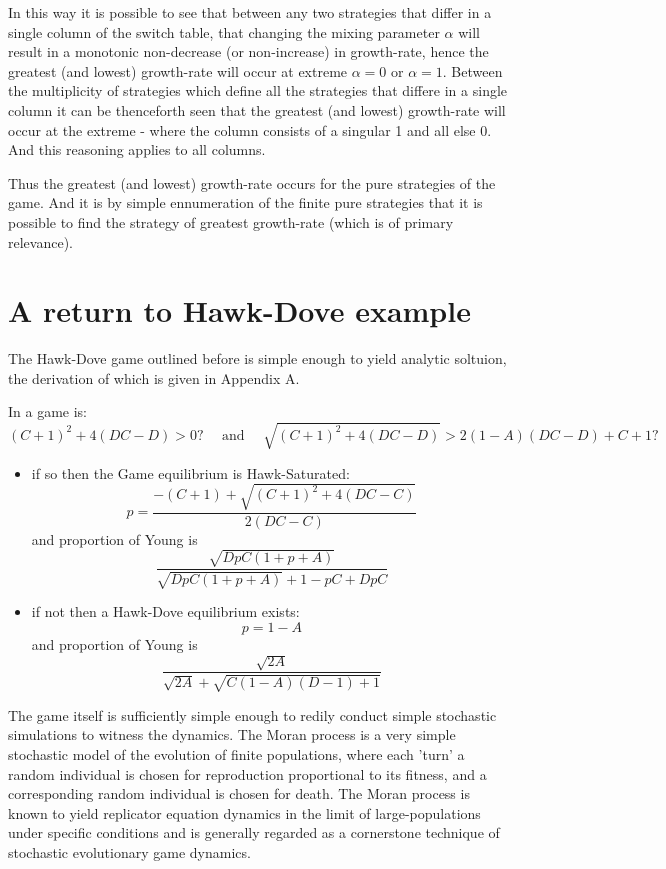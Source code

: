 \documentclass[journal,article,accept,oneauthors,pdftex,10pt,a4paper]{mdpi}
\begin{document}
In this way it is possible to see that between any two strategies that differ in a single column of the switch table, that changing the mixing parameter $\alpha$ will result in a monotonic non-decrease (or non-increase) in growth-rate, hence the greatest (and lowest) growth-rate will occur at extreme $\alpha=0$ or $\alpha=1$.
Between the multiplicity of strategies which define all the strategies that differe in a single column it can be thenceforth seen that the greatest (and lowest) growth-rate will occur at the extreme - where the column consists of a singular 1 and all else 0.
And this reasoning applies to all columns.

Thus the greatest (and lowest) growth-rate occurs for the pure strategies of the game.
And it is by simple ennumeration of the finite pure strategies that it is possible to find the strategy of greatest growth-rate (which is of primary relevance).

\section{A return to Hawk-Dove example}

The Hawk-Dove game outlined before is simple enough to yield analytic soltuion, the derivation of which is given in Appendix A.

In a game is: $$ (C+1)^2+4(DC-D)>0? ~~~~~~\text{and}~~~~~~ \sqrt{(C+1)^2+4(DC-D)} > 2(1-A)(DC-D)+C+1? $$
\begin{itemize}[leftmargin=*,labelsep=3mm]
\item	if so then the Game equilibrium is Hawk-Saturated:$$p=\frac{-(C+1)+\sqrt{(C+1)^2+4(DC-C)}}{2(DC-C)}$$and proportion of Young is$$\frac{\sqrt{DpC(1+p+A)}}{\sqrt{DpC(1+p+A)}+1-pC+DpC}$$
\item	if not then a Hawk-Dove equilibrium exists:$$p=1-A$$and proportion of Young is$$\frac{\sqrt{2A}}{\sqrt{2A}+\sqrt{C(1-A)(D-1)+1}}$$
\end{itemize}

The game itself is sufficiently simple enough to redily conduct simple stochastic simulations to witness the dynamics.
The Moran process is a very simple stochastic model of the evolution of finite populations, where each 'turn' a random individual is chosen for reproduction proportional to its fitness, and a corresponding random individual is chosen for death.
The Moran process is known to yield replicator equation dynamics in the limit of large-populations under specific conditions\cite{stochastic1} and is generally regarded as a cornerstone technique of stochastic evolutionary game dynamics.
\end{document}
